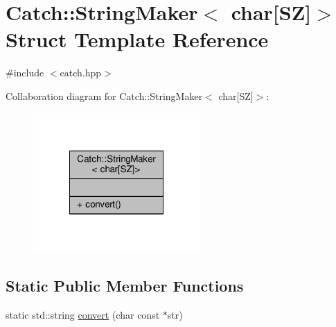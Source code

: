 \hypertarget{struct_catch_1_1_string_maker_3_01char[_s_z]_4}{\section{Catch\-:\-:String\-Maker$<$ char\mbox{[}S\-Z\mbox{]}$>$ Struct Template Reference}
\label{struct_catch_1_1_string_maker_3_01char[_s_z]_4}
}


{\ttfamily \#include $<$catch.\-hpp$>$}



Collaboration diagram for Catch\-:\-:String\-Maker$<$ char\mbox{[}S\-Z\mbox{]}$>$\-:
\nopagebreak
\begin{figure}[H]
\begin{center}
\leavevmode
\includegraphics[width=180pt]{struct_catch_1_1_string_maker_3_01char[_s_z]_4__coll__graph}
\end{center}
\end{figure}
\subsection*{Static Public Member Functions}
\begin{DoxyCompactItemize}
\item 
static std\-::string \hyperlink{struct_catch_1_1_string_maker_3_01char[_s_z]_4_a095e415534f9145300271befe9853357}{convert} (char const $\ast$str)
\end{DoxyCompactItemize}


